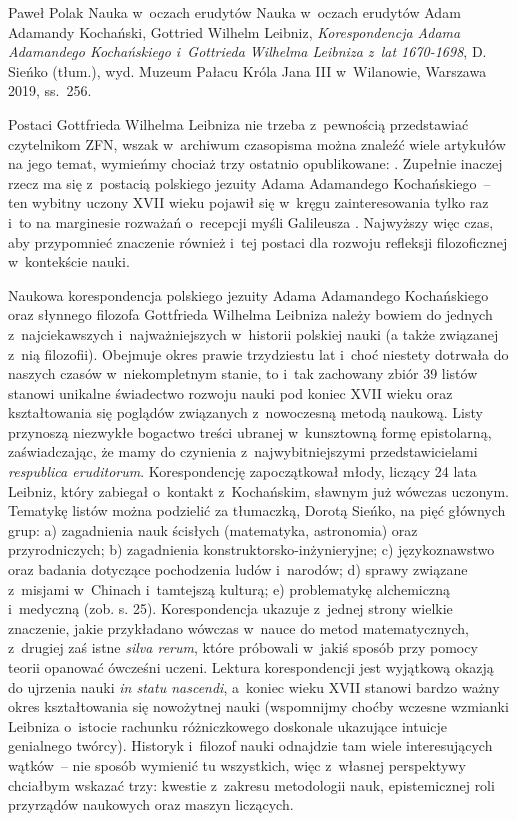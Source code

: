 \begin{recplenv}{Paweł Polak}
	{Nauka w~oczach erudytów}
	{Nauka w~oczach erudytów}
	{Adam Adamandy Kochański, Gottried Wilhelm Leibniz, \textit{Korespondencja Adama Adamandego Kochańskiego i~Gottrieda Wilhelma Leibniza z~lat 1670-1698}, D. Sieńko (tłum.), wyd. Muzeum Pałacu Króla Jana III w~Wilanowie, Warszawa 2019, ss.~256.}
	

Postaci Gottfrieda Wilhelma Leibniza nie trzeba z~pewnością przedstawiać czytelnikom ZFN, wszak w~archiwum czasopisma
można znaleźć wiele artykułów na jego temat, wymieńmy chociaż trzy ostatnio opublikowane:
\parencite{heller_wyzwanie_2016,bubula_woluntaryzm_2011,heller_stworzenie_2008}.
Zupełnie inaczej rzecz ma się z~postacią polskiego jezuity Adama
Adamandego Kochańskiego~-- ten wybitny uczony XVII wieku pojawił się w~kręgu zainteresowania tylko raz i~to na
marginesie rozważań o~recepcji myśli Galileusza
\parencite{targosz_polski_2003}.
Najwyższy więc czas, aby
przypomnieć znaczenie również i~tej postaci dla rozwoju refleksji filozoficznej w~kontekście nauki.

\enlargethispage{.5\baselineskip}

Naukowa korespondencja polskiego jezuity Adama Adamandego Kochańskiego oraz słynnego filozofa Gottfrieda Wilhelma
Leibniza należy bowiem do jednych z~najciekawszych i~najważniejszych w~historii polskiej nauki (a także związanej z~nią
filozofii). Obejmuje okres prawie trzydziestu lat i~choć niestety dotrwała do naszych czasów w~niekompletnym stanie,
to i~tak zachowany zbiór 39 listów stanowi unikalne świadectwo rozwoju nauki pod koniec XVII wieku oraz kształtowania się
poglądów związanych z~nowoczesną metodą naukową. Listy przynoszą niezwykłe bogactwo treści ubranej w~kunsztowną formę
epistolarną, zaświadczając, że mamy do czynienia z~najwybitniejszymi przedstawicielami \textit{respublica eruditorum}.
Korespondencję zapoczątkował młody, liczący 24 lata Leibniz, który zabiegał o~kontakt z~Kochańskim, sławnym już wówczas
uczonym. Tematykę listów można podzielić za tłumaczką, Dorotą Sieńko, na pięć głównych grup: a) zagadnienia nauk
ścisłych (matematyka, astronomia) oraz przyrodniczych; b) zagadnienia konstruktorsko-inżynieryjne; c) językoznawstwo
oraz badania dotyczące pochodzenia ludów i~narodów; d) sprawy związane z~misjami w~Chinach i~tamtejszą kulturą; e)
problematykę alchemiczną i~medyczną (zob. s. 25). Korespondencja ukazuje z~jednej strony wielkie znaczenie, jakie
przykładano wówczas w~nauce do metod matematycznych, z~drugiej zaś istne \textit{silva rerum}, które próbowali w~jakiś
sposób przy pomocy teorii opanować ówcześni uczeni. Lektura korespondencji jest wyjątkową okazją do ujrzenia nauki
\textit{in statu nascendi}, a~koniec wieku XVII stanowi bardzo ważny okres kształtowania się nowożytnej nauki
(wspomnijmy choćby wczesne wzmianki Leibniza o~istocie rachunku różniczkowego doskonale ukazujące intuicje genialnego
twórcy). Historyk i~filozof nauki odnajdzie tam wiele interesujących wątków~-- nie sposób wymienić tu wszystkich, więc z~własnej
perspektywy chciałbym wskazać trzy: kwestie z~zakresu metodologii nauk, epistemicznej roli przyrządów naukowych
oraz maszyn liczących.


\end{recplenv}
